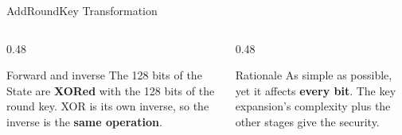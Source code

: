 \documentclass[aspectratio=169,11pt,xcolor={table}]{beamer}
\newcommand{\stategrid}[4]{%
  \foreach \v [count=\k from 0] in {#4}{
    \pgfmathtruncatemacro{\r}{\k/4}\pgfmathtruncatemacro{\c}{mod(\k,4)}
    \node[draw=#3,fill=#3!12,minimum size=6.5mm,font=\scriptsize\ttfamily,inner sep=0pt] at (#1+\c*0.65,#2-\r*0.65) {\v};
  }}
\begin{document}
\begin{frame}{AddRoundKey Transformation}
  \centering
  \vspace{3mm}
  \begin{columns}[T]
    \begin{column}{0.48\textwidth}
      \begin{block}{Forward and inverse}
        \small The 128 bits of the State are \textbf{XORed} with the 128 bits of the round key. XOR is its own inverse, so the inverse is the \textbf{same operation}.
      \end{block}
    \end{column}
    \begin{column}{0.48\textwidth}
      \begin{exampleblock}{Rationale}
        \small As simple as possible, yet it affects \textbf{every bit}. The key expansion's complexity plus the other stages give the security.
      \end{exampleblock}
    \end{column}
  \end{columns}
\end{frame}
\end{document}
